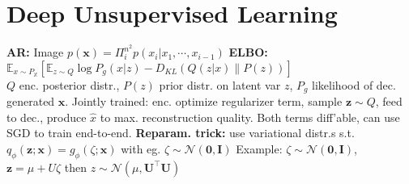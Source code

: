 \section{Deep Unsupervised Learning}
\textbf{AR:} Image $p(\mathbf{x})=\Pi_i^{n^2}p(x_i|x_1,\cdots,x_{i-1})$ \textbf{ELBO:} \\
$\mathbb{E}_{x\sim P_{\mathbb{X}}}[\mathbb{E}_{z\sim Q}{\log P_g(x|z)}-D_{KL}(Q(z|x)\|P(z))]$\\
$Q$ enc. posterior distr., $P(z)$ prior distr. on latent var $z$, $P_g$ likelihood of dec. generated $\mathbf{x}$. 
Jointly trained: enc. optimize regularizer term, sample $\mathbf{z}\sim Q$, feed to dec., produce $\hat{x}$ to max. reconstruction quality. Both terms diff'able, can use SGD to train end-to-end.
\textbf{Reparam. trick:} use variational distr.s s.t. $q_\phi(\mathbf{z};\mathbf{x}) = g_\phi(\zeta;\mathbf{x})$ with eg. $\zeta \sim \mathcal{N}(\mathbf{0}, \mathbf{I})$
Example: 
$\zeta \sim \mathcal{N}(\mathbf{0}, \mathbf{I})$, $\mathbf{z} = \mu + U\zeta$ then $z \sim \mathcal{N}(\mu, \mathbf{U^{\top}U})$